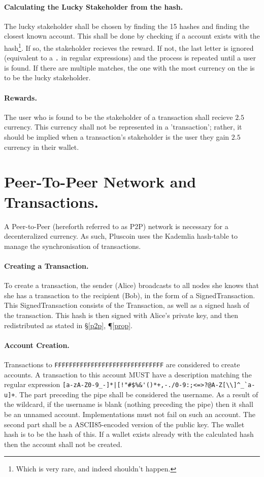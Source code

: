 \documentclass{article}
\begin{document}
\paragraph{Calculating the Lucky Stakeholder from the hash.} The
lucky stakeholder shall be chosen by finding the 15 hashes and finding the
closest known account. This shall be done by checking if a account exists with
the hash\footnote{Which is very rare, and indeed shouldn't happen.}. If so, the
stakeholder recieves the reward. If not, the last letter is ignored (equivalent
to a \verb|.| in regular expressions) and the process is repeated until a user
is found. If there are multiple matches, the one with the most currency on the
is to be the lucky stakeholder.

\paragraph{Rewards.} The user who is found to be the stakeholder of a
transaction shall recieve $2.5$ currency. This currency shall not be
represented in a 'transaction'; rather, it should be implied when a
transaction's stakeholder is the user they gain $2.5$ currency in their wallet.

\label{p2p}
\section{Peer-To-Peer Network and Transactions.}
A Peer-to-Peer (hereforth referred to as P2P) network is necessary for a
decenteralized currency. As such, Pluscoin uses the Kademlia hash-table to
manage the synchronisation of transactions.

\paragraph{Creating a Transaction.} To create a transaction, the sender (Alice)
broadcasts to all nodes she knows that she has a transaction to the recipient
(Bob), in the form of a SignedTransaction. This SignedTransaction consists of
the Transaction, as well as a signed hash of the transaction. This hash is
then signed with Alice's private key, and then redistributed as stated in
\S\ref{p2p}, \P\ref{prop}.

\paragraph{Account Creation.} Transactions to 
{\texttt{F\-F\-F\-F\-F\-F\-F\-F\-F\-F\-F\-F\-F\-F\-F\-F\-F\-F\-F\-F\-F\-F\-F\-F\-F\-F\-F\-F\-F\-F}}
are considered to create accounts. A transaction to this account MUST have a
description matching the regular expression \verb~[a-zA-Z0-9_-]*|[!"#$%&'()*+,-./0-9:;<=>?@A-Z[\\]^_`a-u]+~.
The part preceding the pipe shall be considered the username. As a result of
the wildcard, if the username is blank (nothing preceding the pipe) then it
shall be an unnamed account. Implementations must not fail on such an account.
The second part shall be a ASCII85-encoded version of the public key. The
wallet hash is to be the hash of this. If a wallet exists already with the
calculated hash then the account shall not be created.
\end{document}
